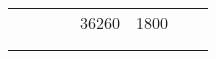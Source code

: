 \documentclass[11pt]{article}
\begin{document}
{{\begin{tabular}{|c|c|cc|c|c|c|c|}
            \cline{5-6} 
            \multicolumn{1}{c}{} & \multicolumn{1}{c}{} &  &  & 36260 & 1800 & \multicolumn{1}{c}{} & \multicolumn{1}{c}{}\tabularnewline
            \cline{5-6} 
            \multicolumn{1}{c}{} & \multicolumn{1}{c}{} &  & \multicolumn{1}{c}{} & \multicolumn{1}{c}{} & \multicolumn{1}{c}{} & \multicolumn{1}{c}{} & \multicolumn{1}{c}{}\tabularnewline
            \multicolumn{1}{c}{} & \multicolumn{1}{c}{} &  & \multicolumn{1}{c}{} & \multicolumn{1}{c}{} & \multicolumn{1}{c}{} & \multicolumn{1}{c}{} & \multicolumn{1}{c}{}\tabularnewline
        \end{tabular}
    }
}
\vspace*{\fill}
\end{document}
